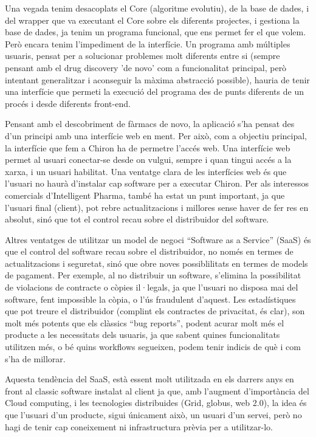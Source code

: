Una vegada tenim desacoplats el Core (algoritme evolutiu), de la base de dades,
i del wrapper que va executant el Core sobre els diferents projectes, i gestiona
la base de dades, ja tenim un programa funcional, que ens permet fer el que
volem.  Però encara tenim l'impediment de la interfície.  Un programa amb
múltiples usuaris, pensat per a solucionar problemes molt diferents entre si
(sempre pensant amb el drug discovery 'de novo' com a funcionalitat principal,
 però intentant generalitzar i aconseguir la màxima abstracció possible), hauria
de tenir una interfície que permeti la execució del programa des de punts
diferents de un procés i desde diferents front-end.  

Pensant amb el descobriment de fàrmacs de novo, la aplicació s'ha pensat des
d'un principi amb una interfície web en ment.  Per això, com a objectiu
principal, la interfície que fem a Chiron ha de permetre l'accés web.  Una
interfície web permet al usuari conectar-se desde on vulgui, sempre i quan
tingui accés a la xarxa, i un usuari habilitat.  Una ventatge clara de les
interfícies web és que l'usuari no haurà d'instalar cap software per a executar
Chiron.  Per als interessos comercials d'Intelligent Pharma, també ha estat un
punt important, ja que l'usuari  final (client), pot rebre actualitzacions i
millores sense haver de fer res en absolut, sinó que tot el control recau sobre
el distribuidor del software.

Altres ventatges de utilitzar un model de negoci ``Software as a Service''
(SaaS) és que el control del software recau sobre el distribuidor, no només en
termes de actualitzacions i seguretat, sinó que obre noves possiblilitats en
termes de models de pagament.   Per exemple, al no distribuir un software,
	   s'elimina la possibilitat de violacions de contracte o còpies il·legals, ja que
	   l'usuari no disposa mai del software, fent impossible la còpia, o l'ús
	   fraudulent d'aquest.  Les estadístiques que pot treure el distribuidor (complint
			   els contractes de privacitat, és clar), son molt més potents que els clàssics
	   ``bug reports'', podent acurar molt més el producte a les necessitats dels
	   usuaris, ja que sabent quines funcionalitats utilitzen més, o bé quins workflows
	   segueixen, podem tenir indicis de què i com s'ha de millorar.

	   Aquesta tendència del SaaS, està essent molt utilitzada en els darrers anys en
	   front al classic software instalat al client ja que, amb l'augment d'importància
	   del Cloud computing, i les tecnologies distribuides (Grid, globus, web 2.0), la
	   idea és que l'usuari d'un producte, sigui únicament això, un usuari d'un servei,
	   però no hagi de tenir cap coneixement ni infrastructura prèvia per a
	   utilitzar-lo.

